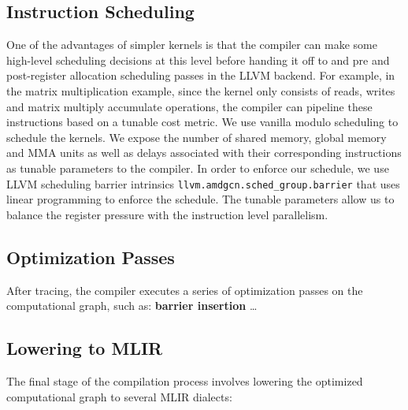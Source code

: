 \documentclass{article}
\begin{document}
\subsection{Instruction Scheduling}
One of the advantages of simpler kernels is that the compiler can make some high-level scheduling decisions at this level before
handing it off to and pre and post-register allocation scheduling passes in the LLVM backend. For example, in the matrix multiplication example,
since the kernel only consists of reads, writes and matrix multiply accumulate operations, the compiler can pipeline these instructions based on
a tunable cost metric. We use vanilla modulo scheduling \cite{dragonbook} to schedule the kernels. We expose the number of shared memory,
global memory and MMA units as well as delays associated with their corresponding instructions as tunable parameters to the compiler.
In order to enforce our schedule, we use LLVM scheduling barrier intrinsics \texttt{llvm.amdgcn.sched\_group.barrier} that uses linear programming
to enforce the schedule. The tunable parameters allow us to balance the register pressure with the instruction level parallelism.


\subsection{Optimization Passes}
After tracing, the compiler executes a series of optimization passes on the computational graph, such as:
\textbf{barrier insertion} %
\ldots

\subsection{Lowering to MLIR}


The final stage of the compilation process involves lowering the optimized computational graph to several MLIR dialects: %
\end{document}
